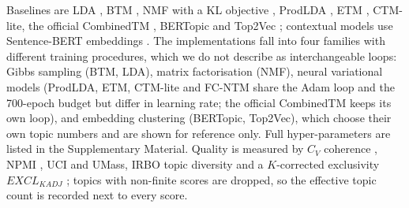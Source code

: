 \documentclass[Journal,letterpaper,NoLists]{ascelike-new}
\newcommand{\fcntm}{FC-NTM}
\begin{document}
Baselines are LDA \cite{blei2003lda}, BTM \cite{yan2013btm}, NMF with a KL objective
\cite{lee2001nmf}, ProdLDA \cite{srivastava2017avitm}, ETM \cite{dieng2020etm}, CTM-lite, the
official CombinedTM \cite{bianchi2021ctm}, BERTopic \cite{grootendorst2022bertopic} and Top2Vec
\cite{angelov2020top2vec}; contextual models use Sentence-BERT embeddings
\cite{reimers2019sbert}. The implementations fall into four families with different training
procedures, which we do not describe as interchangeable loops: Gibbs sampling (BTM, LDA), matrix
factorisation (NMF), neural variational models (ProdLDA, ETM, CTM-lite and \fcntm{} share the Adam
loop and the 700-epoch budget but differ in learning rate; the official CombinedTM keeps its own
loop), and embedding clustering (BERTopic, Top2Vec), which choose their own topic numbers and are
shown for reference only. Full hyper-parameters are listed in the Supplementary Material. Quality
is measured by $C_V$ coherence \cite{roder2015coherence}, NPMI \cite{bouma2009npmi,lau2014tea}, UCI
and UMass, IRBO topic diversity \cite{webber2010rbo} and a $K$-corrected exclusivity
$EXCL_{KADJ}$ \cite{bischof2012exclusivity}; topics with non-finite scores are dropped, so the
effective topic count is recorded next to every score.
\end{document}
